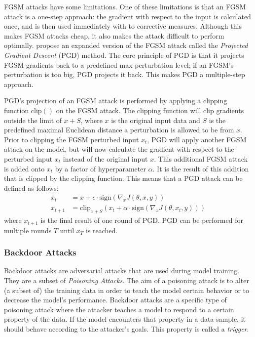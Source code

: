 \documentclass[11pt]{article}
\begin{document}
FGSM attacks have some limitations.
One of these limitations is that an FGSM attack is a one-step approach: the gradient with respect to the input is calculated once, and is then used immediately with to corrective measures.
Although this makes FGSM attacks cheap, it also makes the attack difficult to perform optimally.
\citet{madry2018towards} propose an expanded version of the FGSM attack called the \textit{Projected Gradient Descent} (PGD) method.
The core principle of PGD is that it projects FGSM gradients back to a predefined max perturbation level; if an FGSM's perturbation is too big, PGD projects it back.
This makes PGD a multiple-step approach.

PGD's projection of an FGSM attack is performed by applying a clipping function $\text{clip}()$ on the FGSM attack.
The clipping function will clip gradients outside the limit of $x + S$, where $x$ is the original input data and $S$ is the predefined maximal Euclidean distance a perturbation is allowed to be from $x$.
Prior to clipping the FGSM perturbed input $x_t$, PGD will apply another FGSM attack on the model, but will now calculate the gradient with respect to the perturbed input $x_t$ instead of the original input $x$.
This additional FGSM attack is added onto $x_t$ by a factor of hyperparameter $\alpha$.
It is the result of this addition that is clipped by the clipping function.
This means that a PGD attack can be defined as follows:
\begin{align*}
  x_t &= x + \epsilon \cdot \text{sign}(\nabla_x J(\theta, x, y)) \\
  x_{t+1} &= \text{clip}_{x + S}(x_t + \alpha \cdot \text{sign}(\nabla_x J(\theta, x_t, y)))
\end{align*}
where $x_{t+1}$ is the final result of one round of PGD.
PGD can be performed for multiple rounds $T$ until $x_T$ is reached. 

\subsubsection{Backdoor Attacks}
Backdoor attacks are adversarial attacks that are used during model training.
They are a subset of \textit{Poisoning Attacks}.
The aim of a poisoning attack is to alter (a subset of) the training data in order to teach the model certain behavior or to decrease the model's performance.
Backdoor attacks are a specific type of poisoning attack where the attacker teaches a model to respond to a certain property of the data.
If the model encounters that property in a data sample, it should behave according to the attacker's goals.
This property is called a \textit{trigger}.
\end{document}
